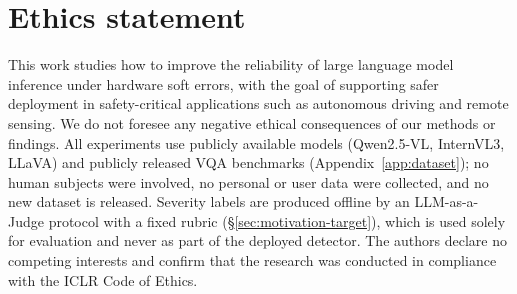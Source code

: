 \section*{Ethics statement}

This work studies how to improve the reliability of large language model inference under hardware soft errors, with the goal of supporting safer deployment in safety-critical applications such as autonomous driving and remote sensing. We do not foresee any negative ethical consequences of our methods or findings. All experiments use publicly available models (Qwen2.5-VL, InternVL3, LLaVA) and publicly released VQA benchmarks (Appendix~\ref{app:dataset}); no human subjects were involved, no personal or user data were collected, and no new dataset is released. Severity labels are produced offline by an LLM-as-a-Judge protocol with a fixed rubric (\S\ref{sec:motivation-target}), which is used solely for evaluation and never as part of the deployed detector. The authors declare no competing interests and confirm that the research was conducted in compliance with the ICLR Code of Ethics.

